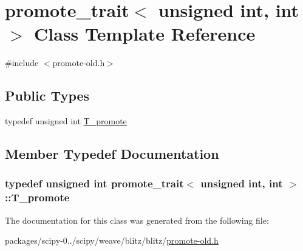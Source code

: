 \hypertarget{classpromote__trait_3_01unsigned_01int_00_01int_01_4}{}\section{promote\+\_\+trait$<$ unsigned int, int $>$ Class Template Reference}
\label{classpromote__trait_3_01unsigned_01int_00_01int_01_4}


{\ttfamily \#include $<$promote-\/old.\+h$>$}

\subsection*{Public Types}
\begin{DoxyCompactItemize}
\item 
typedef unsigned int \hyperlink{classpromote__trait_3_01unsigned_01int_00_01int_01_4_a56efe7d9c4f234cd1a61c60f0b148bef}{T\+\_\+promote}
\end{DoxyCompactItemize}


\subsection{Member Typedef Documentation}
\hypertarget{classpromote__trait_3_01unsigned_01int_00_01int_01_4_a56efe7d9c4f234cd1a61c60f0b148bef}{}
\subsubsection[{T\+\_\+promote}]{\setlength{\rightskip}{0pt plus 5cm}typedef unsigned int {\bf promote\+\_\+trait}$<$ unsigned int, int $>$\+::{\bf T\+\_\+promote}}\label{classpromote__trait_3_01unsigned_01int_00_01int_01_4_a56efe7d9c4f234cd1a61c60f0b148bef}


The documentation for this class was generated from the following file\+:\begin{DoxyCompactItemize}
\item 
packages/scipy-\/0../scipy/weave/blitz/blitz/\hyperlink{promote-old_8h}{promote-\/old.\+h}\end{DoxyCompactItemize}
